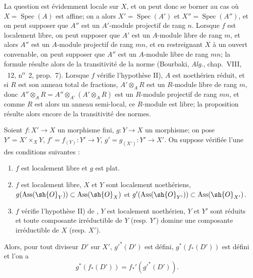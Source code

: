 La question est évidemment locale sur $X$, et on peut donc se borner au cas où $X=\operatorname{Spec}(A)$ est affine;
on a alors $X'=\operatorname{Spec}(A')$ et $X''=\operatorname{Spec}(A'')$, et on peut supposer que $A''$ est un $A'$-module projectif de rang $n$.
Lorsque $f$ est localement libre, on peut supposer que $A'$ est un $A$-module libre de rang $m$, et alors $A''$ est un $A$-module projectif de rang $mn$, et en restreignant $X$ à un ouvert convenable, on peut supposer que $A''$ est un $A$-module libre de rang $mn$;
la formule  résulte alors de la transitivité de la norme (Bourbaki, \emph{Alg.}, chap.~VIII, \textsection~12, n\textsuperscript{o}~2, prop.~7).
Lorsque $f$ vérifie l'hypothèse II), $A$ est noethérien réduit, et si $R$ est son anneau total de fractions, $A'\otimes_A R$ est un $R$-module libre de rang $m$, donc $A''\otimes_A R=A''\otimes_{A'}(A'\otimes_A R)$ est un $R$-module projectif de rang $mn$, et comme $R$ est alors un anneau semi-local, ce $R$-module est libre;
la proposition résulte alors encore de la transitivité des normes.

\begin{proposition}[21.5.8]
\label{IV.21.5.8}
Soient $f:X'\to X$ un morphisme fini, $g:Y\to X$ un morphisme;
on pose $Y'=X'\times_XY$, $f'=f_{(Y)}:Y'\to Y$, $g'=g_{(X')}:Y'\to X'$.
On suppose vérifiée l'une des conditions suivantes :
\begin{enumerate}[label=\textup{(\roman*)}]
  \item $f$ est localement libre et $g$ est plat.
  \item $f$ est localement libre, $X$ et $Y$ sont localement noethériens, $g(\operatorname{Ass}(\sh{O}_Y))\subset\operatorname{Ass}(\sh{O}_X)$ et $g'(\operatorname{Ass}(\sh{O}_{Y'}))\subset\operatorname{Ass}(\sh{O}_{X'})$.
  \item $f$ vérifie l'hypothèse \textup{II)} de , $Y$ est localement noethérien, $Y$ et $Y'$ sont réduits et toute composante irréductible de $Y$ \textup{(resp.} $Y'$\textup{)} domine une composante irréductible de $X$ \textup{(resp.} $X'$\textup{)}.
\end{enumerate}

Alors, pour tout diviseur $D'$ sur $X'$, $g'^*(D')$ est défini, $g^*(f_*(D'))$ est défini et l'on a
\[
\label{IV.21.5.8.1}
  g^*(f_*(D'))=f_*'(g'^*(D')).
  \tag{21.5.8.1}
\]
\end{proposition}

